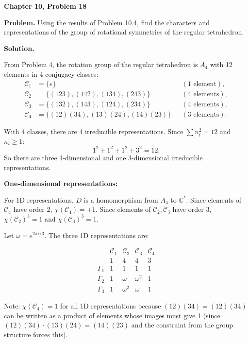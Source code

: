 \documentclass[12pt]{article}
\begin{document}
\begin{center}
{\Large\bfseries Chapter 10, Problem 18}
\end{center}

\noindent\textbf{Problem.} Using the results of Problem 10.4, find the characters and representations of the group of rotational symmetries of the regular tetrahedron.

\bigskip
\noindent\textbf{Solution.}

From Problem 4, the rotation group of the regular tetrahedron is $A_4$ with 12 elements in 4 conjugacy classes:
\begin{align*}
\mathcal{C}_1 &= \{e\} &&(1 \text{ element}), \\
\mathcal{C}_2 &= \{(123), (142), (134), (243)\} &&(4 \text{ elements}), \\
\mathcal{C}_3 &= \{(132), (143), (124), (234)\} &&(4 \text{ elements}), \\
\mathcal{C}_4 &= \{(12)(34), (13)(24), (14)(23)\} &&(3 \text{ elements}).
\end{align*}

With 4 classes, there are 4 irreducible representations. Since $\sum n_i^2 = 12$ and $n_i \geq 1$:
\[
1^2 + 1^2 + 1^2 + 3^2 = 12.
\]
So there are three 1-dimensional and one 3-dimensional irreducible representations.

\medskip
\noindent\textbf{One-dimensional representations:}

For 1D representations, $D$ is a homomorphism from $A_4$ to $\mathbb{C}^*$. Since elements of $\mathcal{C}_4$ have order 2, $\chi(\mathcal{C}_4) = \pm 1$. Since elements of $\mathcal{C}_2, \mathcal{C}_3$ have order 3, $\chi(\mathcal{C}_2)^3 = 1$ and $\chi(\mathcal{C}_3)^3 = 1$.

Let $\omega = e^{2\pi i/3}$. The three 1D representations are:

\[
\begin{array}{c|cccc}
 & \mathcal{C}_1 & \mathcal{C}_2 & \mathcal{C}_3 & \mathcal{C}_4 \\
 & 1 & 4 & 4 & 3 \\
\hline
\Gamma_1 & 1 & 1 & 1 & 1 \\
\Gamma_2 & 1 & \omega & \omega^2 & 1 \\
\Gamma_3 & 1 & \omega^2 & \omega & 1
\end{array}
\]

Note: $\chi(\mathcal{C}_4) = 1$ for all 1D representations because $(12)(34) = (12)(34)$ can be written as a product of elements whose images must give 1 (since $(12)(34) \cdot (13)(24) = (14)(23)$ and the constraint from the group structure forces this).
\end{document}

